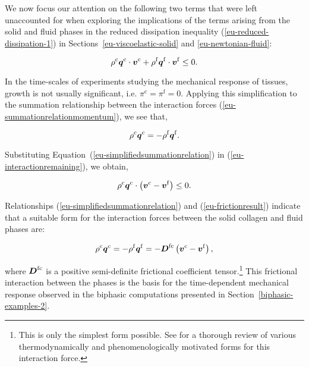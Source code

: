 We now focus our attention on the following two terms that were left
unaccounted for when exploring the implications of the terms arising
from the solid and fluid phases in the reduced dissipation inequality
(\ref{eu-reduced-dissipation-1}) in
Sections~\ref{eu-viscoelastic-solid} and \ref{eu-newtonian-fluid}:

\begin{equation}
\rho^{\mathrm{c}} \mbox{\boldmath$ q$}^{\mathrm{c}}\cdot\mbox{\boldmath$ v$}^{\mathrm{c}} +
\rho^{\mathrm{f}} \mbox{\boldmath$ q$}^{\mathrm{f}}\cdot\mbox{\boldmath$ v$}^{\mathrm{f}} \leq 0.
\label{eu-interactionremaining}
\end{equation}

In the time-scales of experiments studying the mechanical response of
tissues, growth is not usually significant, i.e. $\pi^\mathrm{c} =
\pi^\mathrm{f} = 0$. Applying this simplification to the summation
relationship between the interaction forces
(\ref{eu-summationrelationmomentum}), we see that,

\begin{equation}
\rho^\mathrm{c}
\mbox{\boldmath$ q$}^\mathrm{c} = - \rho^\mathrm{f} \mbox{\boldmath$ q$}^\mathrm{f}.
\label{eu-simplifiedsummationrelation}
\end{equation}

\noindent Substituting Equation~(\ref{eu-simplifiedsummationrelation})
in (\ref{eu-interactionremaining}), we obtain,

\begin{equation}
\rho^{\mathrm{c}} \mbox{\boldmath$ q$}^{\mathrm{c}}\cdot \left(\mbox{\boldmath$ v$}^{\mathrm{c}} -
\mbox{\boldmath$ v$}^{\mathrm{f}}\right) \leq 0.
\label{eu-frictionresult}
\end{equation}

Relationships (\ref{eu-simplifiedsummationrelation}) and
(\ref{eu-frictionresult}) indicate that a suitable form for the
interaction forces between the solid collagen and fluid phases are:

\begin{equation}
\rho^{\mathrm{c}} \mbox{\boldmath$ q$}^{\mathrm{c}} 
= - \rho^{\mathrm{f}} \mbox{\boldmath$ q$}^{\mathrm{f}}
= -\mbox{\boldmath$ D$}^{\mathrm{fc}}
\left(\mbox{\boldmath$ v$}^{\mathrm{c}} - \mbox{\boldmath$ v$}^{\mathrm{f}}\right),
\label{eu-interactionforces}
\end{equation}

\noindent where $\mbox{\boldmath$ D$}^{\mathrm{fc}}$ is a positive semi-definite
frictional coefficient tensor.\footnote{This is only the simplest form
  possible. See \citet{massoudi03} for a thorough review of various
  thermodynamically and phenomenologically motivated forms for this
  interaction force.} This frictional interaction between the phases
is the basis for the time-dependent mechanical response observed in
the biphasic computations presented in
Section~\ref{biphasic-examples-2}.


